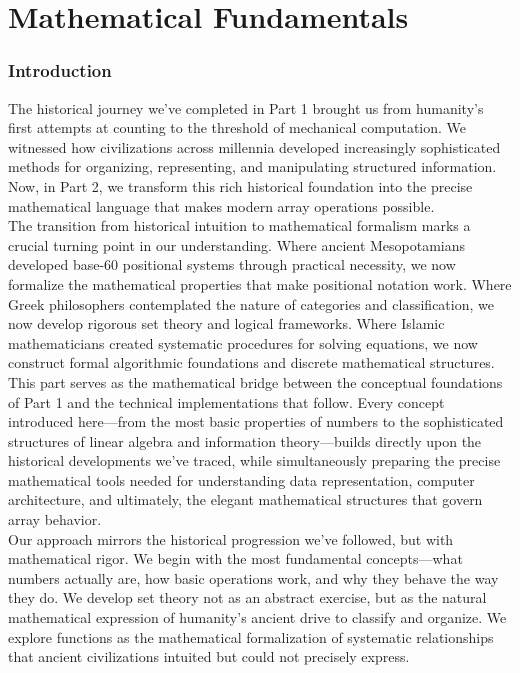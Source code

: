 
\part{Mathematical Fundamentals}
\section*{Introduction}

The historical journey we've completed in Part 1 brought us from humanity's first attempts at counting to the threshold of mechanical computation. We witnessed how civilizations across millennia developed increasingly sophisticated methods for organizing, representing, and manipulating structured information. Now, in Part 2, we transform this rich historical foundation into the precise mathematical language that makes modern array operations possible.\\
The transition from historical intuition to mathematical formalism marks a crucial turning point in our understanding. Where ancient Mesopotamians developed base-60 positional systems through practical necessity, we now formalize the mathematical properties that make positional notation work. Where Greek philosophers contemplated the nature of categories and classification, we now develop rigorous set theory and logical frameworks. Where Islamic mathematicians created systematic procedures for solving equations, we now construct formal algorithmic foundations and discrete mathematical structures.\\
This part serves as the mathematical bridge between the conceptual foundations of Part 1 and the technical implementations that follow. Every concept introduced here—from the most basic properties of numbers to the sophisticated structures of linear algebra and information theory—builds directly upon the historical developments we've traced, while simultaneously preparing the precise mathematical tools needed for understanding data representation, computer architecture, and ultimately, the elegant mathematical structures that govern array behavior.\\
Our approach mirrors the historical progression we've followed, but with mathematical rigor. We begin with the most fundamental concepts—what numbers actually are, how basic operations work, and why they behave the way they do. We develop set theory not as an abstract exercise, but as the natural mathematical expression of humanity's ancient drive to classify and organize. We explore functions as the mathematical formalization of systematic relationships that ancient civilizations intuited but could not precisely express.\\
